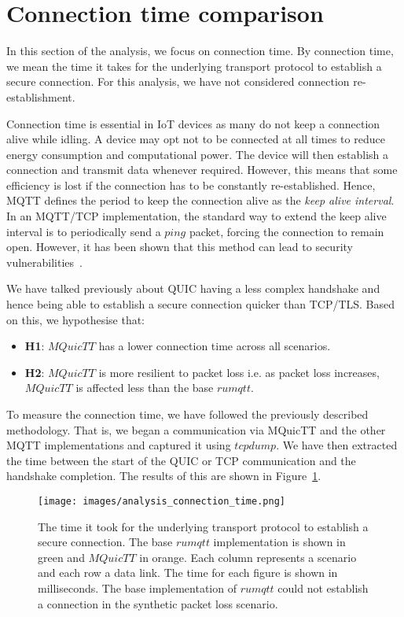 \section{Connection time comparison} \label{sec:conn_time}

In this section of the analysis, we focus on connection time.
By connection time, we mean the time it takes for the underlying transport protocol to establish a secure connection.
For this analysis, we have not considered connection re-establishment.

Connection time is essential in IoT devices as many do not keep a connection alive while idling.
A device may opt not to be connected at all times to reduce energy consumption and computational power.
The device will then establish a connection and transmit data whenever required.
However, this means that some efficiency is lost if the connection has to be constantly re-established.
Hence, MQTT defines the period to keep the connection alive as the \textit{keep alive interval}.
In an MQTT/TCP implementation, the standard way to extend the keep alive interval is to periodically send a $ping$ packet, forcing the connection to remain open.
However, it has been shown that this method can lead to security vulnerabilities~\citep{vaccari_slowtt_2020,mileva_comprehensive_2021}.

We have talked previously about QUIC having a less complex handshake and hence being able to establish a secure connection quicker than TCP/TLS.
Based on this, we hypothesise that:

\begin{itemize}
    \item \textbf{H1}: $MQuicTT$ has a lower connection time across all scenarios.
    \item \textbf{H2}: $MQuicTT$ is more resilient to packet loss i.e. as packet loss increases, $MQuicTT$ is affected less than the base $rumqtt$.
\end{itemize}

To measure the connection time, we have followed the previously described methodology.
That is, we began a communication via MQuicTT and the other MQTT implementations and captured it using $tcpdump$.
We have then extracted the time between the start of the QUIC or TCP communication and the handshake completion.
The results of this are shown in Figure~\ref{fig:connection_time}.

\begin{figure}[ht]
    \centering
    \texttt{[image: images/analysis\_connection\_time.png]}
    \caption{The time it took for the underlying transport protocol to establish a secure connection.
    The base $rumqtt$ implementation is shown in green and $MQuicTT$ in orange.
    Each column represents a scenario and each row a data link.
    The time for each figure is shown in milliseconds. The base implementation of $rumqtt$ could not establish a connection in the synthetic packet loss scenario.}
    \label{fig:connection_time}
\end{figure}

